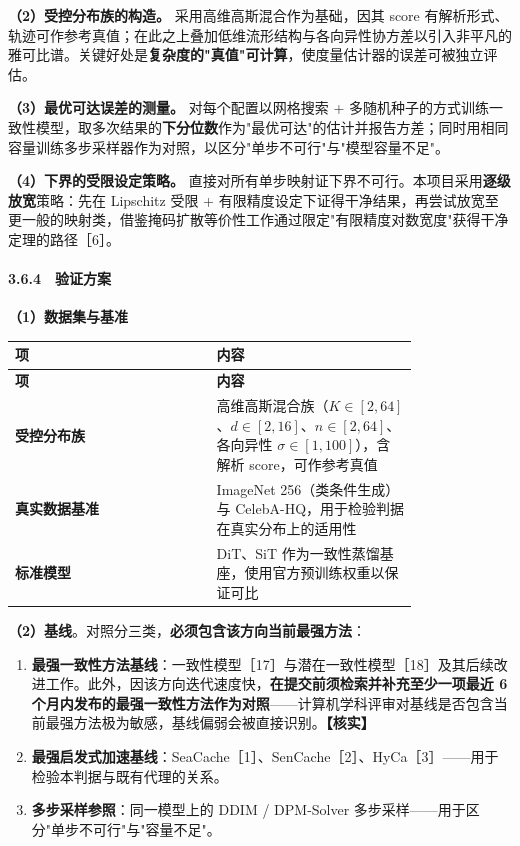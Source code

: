 \documentclass[12pt,a4paper]{ctexart}
\begin{document}
\textbf{（2）受控分布族的构造。} 采用高维高斯混合作为基础，因其 score 有解析形式、轨迹可作参考真值；在此之上叠加低维流形结构与各向异性协方差以引入非平凡的雅可比谱。关键好处是\textbf{复杂度的"真值"可计算}，使度量估计器的误差可被独立评估。

\textbf{（3）最优可达误差的测量。} 对每个配置以网格搜索 + 多随机种子的方式训练一致性模型，取多次结果的\textbf{下分位数}作为"最优可达"的估计并报告方差；同时用相同容量训练多步采样器作为对照，以区分"单步不可行"与"模型容量不足"。

\textbf{（4）下界的受限设定策略。} 直接对所有单步映射证下界不可行。本项目采用\textbf{逐级放宽}策略：先在 Lipschitz 受限 + 有限精度设定下证得干净结果，再尝试放宽至更一般的映射类，借鉴掩码扩散等价性工作通过限定"有限精度对数宽度"获得干净定理的路径［6］。

\paragraph{3.6.4　验证方案}

\textbf{（1）数据集与基准}

\begin{longtable}{|>{\raggedright\arraybackslash}p{0.400\linewidth}|>{\raggedright\arraybackslash}p{0.400\linewidth}|}
\hline
\textbf{项} & \textbf{内容} \\
\hline
\endfirsthead
\hline
\textbf{项} & \textbf{内容} \\
\hline
\endhead
\textbf{受控分布族} & 高维高斯混合族（$K \in [2, 64]$、$d \in [2, 16]$、$n \in [2, 64]$、各向异性 $\sigma \in [1, 100]$），含解析 score，可作参考真值 \\
\hline
\textbf{真实数据基准} & ImageNet 256（类条件生成）与 CelebA-HQ，用于检验判据在真实分布上的适用性 \\
\hline
\textbf{标准模型} & DiT、SiT 作为一致性蒸馏基座，使用官方预训练权重以保证可比 \\
\hline
\end{longtable}

\textbf{（2）基线}。对照分三类，\textbf{必须包含该方向当前最强方法}：

\begin{enumerate}[leftmargin=2em,itemsep=2pt,topsep=3pt]
  \item \textbf{最强一致性方法基线}：一致性模型［17］与潜在一致性模型［18］及其后续改进工作。此外，因该方向迭代速度快，\textbf{在提交前须检索并补充至少一项最近 6 个月内发布的最强一致性方法作为对照}——计算机学科评审对基线是否包含当前最强方法极为敏感，基线偏弱会被直接识别。\textbf{【核实】}
  \item \textbf{最强启发式加速基线}：SeaCache［1］、SenCache［2］、HyCa［3］——用于检验本判据与既有代理的关系。
  \item \textbf{多步采样参照}：同一模型上的 DDIM / DPM-Solver 多步采样——用于区分"单步不可行"与"容量不足"。
\end{enumerate}
\end{document}
